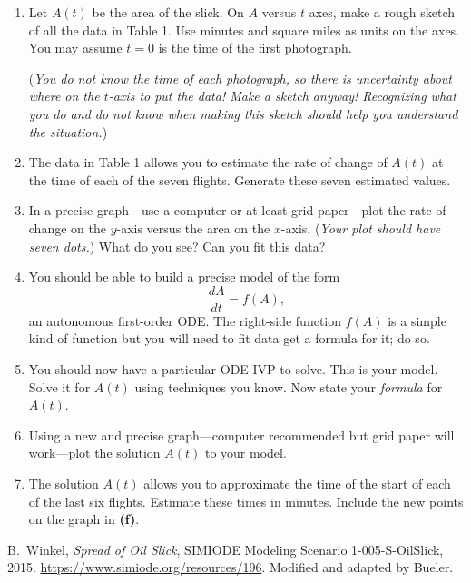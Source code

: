 \documentclass[12pt]{article}
\begin{document}
\bigskip

\renewcommand{\labelenumi}{\textbf{(\alph{enumi})}}
\begin{enumerate}
\item Let $A(t)$ be the area of the slick.  On $A$ versus $t$ axes, make a rough sketch of all the data in Table 1.  Use minutes and square miles as units on the axes.   You may assume $t=0$ is the time of the first photograph.

(\emph{You do \emph{not} know the time of each photograph, so there is uncertainty about where on the $t$-axis to put the data!  Make a \emph{sketch} anyway!  Recognizing what you do and do not know when making this \emph{sketch} should help you understand the situation.})

\item The data in Table 1 allows you to estimate the rate of change of $A(t)$ at the time of each of the seven flights.  Generate these seven estimated values.

\item In a precise graph---use a computer or at least grid paper---plot the rate of change on the $y$-axis versus the area on the $x$-axis.  (\emph{Your plot should have seven dots.})  What do you see?  Can you fit this data?

\item You should be able to build a precise model of the form
    $$\frac{dA}{dt} = f(A),$$
an autonomous first-order ODE.  The right-side function $f(A)$ is a simple kind of function but you will need to fit data get a formula for it; do so.

\item You should now have a particular ODE IVP to solve.  This is your model.  Solve it for $A(t)$ using techniques you know.  Now state your \emph{formula} for $A(t)$.

\item Using a new and precise graph---computer recommended but grid paper will work---plot the solution $A(t)$ to your model.

\item The solution $A(t)$ allows you to approximate the time of the start of each of the last six flights.  Estimate these times in minutes.  Include the new points on the graph in \textbf{(f)}.
\end{enumerate}

\begin{thebibliography}{1}

B.~Winkel, \textit{Spread of Oil Slick}, SIMIODE Modeling Scenario 1-005-S-OilSlick, 2015.  \url{https://www.simiode.org/resources/196}.  Modified and adapted by Bueler.

\end{thebibliography}
\end{document}
